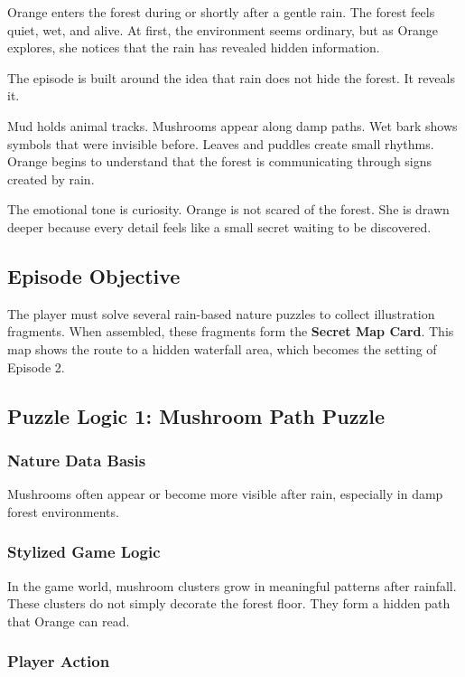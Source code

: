 \documentclass[12pt]{article}
\begin{document}
Orange enters the forest during or shortly after a gentle rain. The forest feels quiet, wet, and alive. At first, the environment seems ordinary, but as Orange explores, she notices that the rain has revealed hidden information.

The episode is built around the idea that rain does not hide the forest. It reveals it.

Mud holds animal tracks. Mushrooms appear along damp paths. Wet bark shows symbols that were invisible before. Leaves and puddles create small rhythms. Orange begins to understand that the forest is communicating through signs created by rain.

The emotional tone is curiosity. Orange is not scared of the forest. She is drawn deeper because every detail feels like a small secret waiting to be discovered.

\subsection{Episode Objective}

The player must solve several rain-based nature puzzles to collect illustration fragments. When assembled, these fragments form the \textbf{Secret Map Card}. This map shows the route to a hidden waterfall area, which becomes the setting of Episode 2.

\subsection{Puzzle Logic 1: Mushroom Path Puzzle}

\subsubsection{Nature Data Basis}

Mushrooms often appear or become more visible after rain, especially in damp forest environments.

\subsubsection{Stylized Game Logic}

In the game world, mushroom clusters grow in meaningful patterns after rainfall. These clusters do not simply decorate the forest floor. They form a hidden path that Orange can read.

\subsubsection{Player Action}
\end{document}
